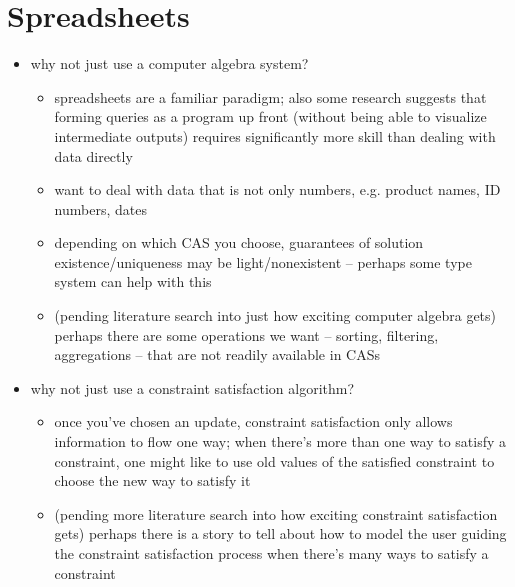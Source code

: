\section{Spreadsheets}
\begin{itemize}
    \item why not just use a computer algebra system?
        \begin{itemize}
            \item spreadsheets are a familiar paradigm; also some research
                suggests that forming queries as a program up front (without
                being able to visualize intermediate outputs) requires
                significantly more skill than dealing with data directly
            \item want to deal with data that is not only numbers, e.g.
                product names, ID numbers, dates
            \item depending on which CAS you choose, guarantees of solution
                existence/uniqueness may be light/nonexistent -- perhaps
                some type system can help with this
            \item (pending literature search into just how exciting computer
                algebra gets) perhaps there are some operations we want --
                sorting, filtering, aggregations -- that are not readily
                available in CASs
        \end{itemize}
    \item why not just use a constraint satisfaction algorithm?
        \begin{itemize}
            \item once you've chosen an update, constraint satisfaction only
                allows information to flow one way; when there's more than
                one way to satisfy a constraint, one might like to use old
                values of the satisfied constraint to choose the new way to
                satisfy it
            \item (pending more literature search into how exciting
                constraint satisfaction gets) perhaps there is a story to
                tell about how to model the user guiding the constraint
                satisfaction process when there's many ways to satisfy a
                constraint
        \end{itemize}
\end{itemize}

